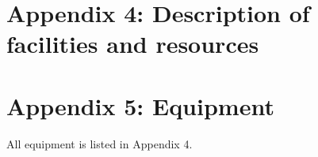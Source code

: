 \documentclass[11pt,titlepage]{report}
\begin{document}
{\section*{Appendix 4: Description of facilities and resources}



\clearpage
{}

\section*{Appendix 5: Equipment}


\vspace{2ex}
\noindent
All equipment is listed in Appendix 4.

\clearpage
{}




%
%
%
%
%
%
%
%
%
%
%
%
%
%
%
%
%   

}
\end{document}
